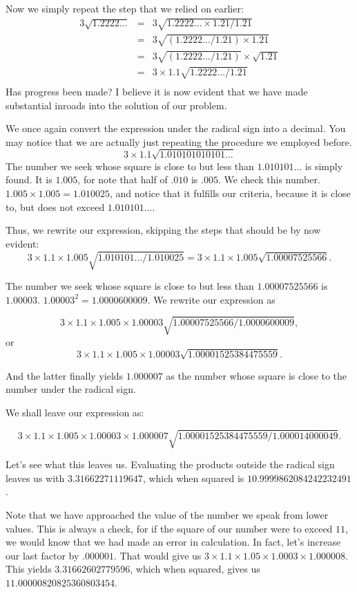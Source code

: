 \documentclass[12pt]{article}
\begin{document}
Now we simply repeat the step that we relied on earlier:
\begin{eqnarray*}
3\sqrt{1.2222\ldots} &=& 3\sqrt{1.2222\ldots \times 1.21/1.21} \\
                     &=& 3\sqrt{(1.2222\ldots /1.21) \times 1.21} \\
                     &=& 3 \sqrt{(1.2222\ldots /1.21)} \times \sqrt{1.21} \\
                     &=& 3 \times 1.1 \sqrt{1.2222\ldots/1.21} \\
\end{eqnarray*}
Has progress been made? I believe it is now evident that we have made substantial inroads into the solution of our problem.

We once again convert the expression under the radical sign into a decimal. You may notice that we are actually just repeating the procedure we employed before.
$$3 \times 1.1  \sqrt{1.010101010101\ldots}$$
The number we seek whose square is close to but less than $1.010101\ldots$ is simply found. It is $1.005$, for note that half of $.010$ is $.005$. We check this number. $1.005 \times 1.005 = 1.010025$, and notice that it fulfills our criteria, because it is close to, but does not exceed $1.010101\ldots$.

Thus, we rewrite our expression, skipping the steps that should be by now evident:
$$3 \times 1.1 \times 1.005  \sqrt{1.010101\ldots/1.010025}
= 3 \times 1.1 \times 1.005  \sqrt{1.00007525566}.$$

The number we seek whose square is close to but less than $1.00007525566$ is $1.00003$. $1.00003^2 = 1.0000600009$. We rewrite our expression as

$$3 \times 1.1 \times 1.005 \times 1.00003 \sqrt{1.00007525566/1.0000600009},$$
or
$$3 \times 1.1 \times 1.005 \times 1.00003 \sqrt{1.00001525384475559}.$$

And the latter finally yields $1.000007$ as the number whose square is close to the number under the radical sign.

We shall leave our expression as:

$$3 \times 1.1 \times 1.005 \times 1.00003 \times 1.000007 \sqrt{1.00001525384475559/1.000014000049}.$$

Let’s see what this leaves us. Evaluating the products outside the radical sign leaves us with $3.31662271119647$, which when squared is $10.9999862084242232491$.

Note that we have approached the value of the number we speak from lower values. This is always a check, for if the square of our number were to exceed $11$, we would know that we had made an error in calculation. In fact, let’s increase our last factor by $.000001$. That would give us $3 \times 1.1 \times 1.05 \times 1.0003 \times 1.000008$.  This yields $3.31662602779596$, which when squared, gives us $11.00000820825360803454$.
\end{document}
